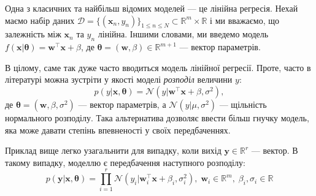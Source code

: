 \begin{example}
	Одна з класичних та найбільш відомих моделей --- це лінійна регресія. Нехай
	маємо набір даних $\mathcal{D} = \{(\mathbf{x}_n, y_n)\}_{1 \leq n \leq N}
	\subset \mathbb{R}^m \times \mathbb{R}$ і ми вважаємо, що залежність між
	$\mathbf{x}_n$ та $y_n$ лінійна. Іншими словами, ми введемо модель
	$f(\mathbf{x}|\boldsymbol{\theta}) = \boldsymbol{w}^{\top} \mathbf{x} +
	\beta$, де $\boldsymbol{\theta}=(\boldsymbol{w},\beta) \in \mathbb{R}^{m+1}$
	--- вектор параметрів. 

	В цілому, саме так дуже часто вводиться модель лінійної регресії. Проте, часто
	в літературі можна зустріти у якості моделі \textit{розподіл} величини $y$:
	\begin{equation}
		p(y|\mathbf{x},\boldsymbol{\theta}) = \mathcal{N}(y|\boldsymbol{w}^{\top}\mathbf{x} + \beta, \sigma^2),
	\end{equation}
	де $\boldsymbol{\theta} = (\boldsymbol{w},\beta,\sigma^2)$ --- вектор
	параметрів, а $\mathcal{N}(y|\mu,\sigma^2)$ --- щільність нормального
	розподілу. Така альтернатива дозволяє ввести більш гнучку модель, яка може
	давати степінь впевненості у своїх передбаченнях.
\end{example}

\begin{remark}
	Приклад вище легко узагальнити для випадку, коли вихід $\mathbf{y} \in \mathbb{R}^r$ --- вектор. В такому випадку, 
	моделлю є передбачення наступного розподілу:
	\begin{equation}
		p(\mathbf{y}|\mathbf{x},\boldsymbol{\theta}) = \prod_{i=1}^r \mathcal{N}(y_i|\boldsymbol{w}_i^{\top}\mathbf{x} + \beta_i, \sigma_i^2), \; \boldsymbol{w}_i \in \mathbb{R}^m, \; \beta_i,\sigma_i \in \mathbb{R}
	\end{equation}
\end{remark}

